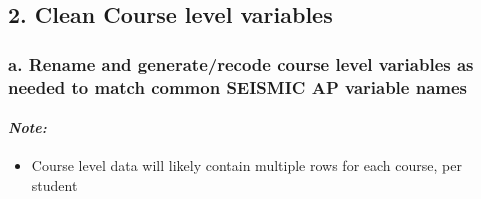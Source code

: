 \documentclass[]{article}
\providecommand{\tightlist}{%
  \setlength{\itemsep}{0pt}\setlength{\parskip}{0pt}}
\let\oldparagraph\paragraph
\renewcommand{\paragraph}[1]{\oldparagraph{#1}\mbox{}}
\begin{document}
\subsection{2. Clean Course level
variables}\label{clean-course-level-variables}

\subsubsection{a. Rename and generate/recode course level variables as
needed to match common SEISMIC AP variable
names}\label{a.-rename-and-generaterecode-course-level-variables-as-needed-to-match-common-seismic-ap-variable-names}

\paragraph{\texorpdfstring{\emph{Note:}}{Note:}}\label{note-2}

\begin{itemize}
\tightlist
\item
  Course level data will likely contain multiple rows for each course,
  per student
\end{itemize}
\end{document}
